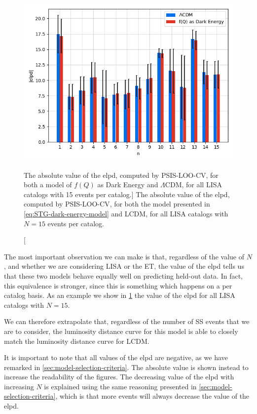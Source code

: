 \begin{figure}[h!]
    \centering
    \includegraphics[width=0.7\columnwidth]{figures/elpd-LISA-N15.png}
    \caption
    [The absolute value of the elpd, computed by PSIS-LOO-CV, for both a model of $f(Q)$ as Dark Energy and $\Lambda$CDM, for all LISA catalogs with 15 events per catalog.]
    {The absolute value of the \gls{elpd}, computed by \gls{PSIS-LOO-CV}, for both the model presented in \cref{eq:STG-dark-energy-model} and \gls{LCDM}, for all \gls{LISA} catalogs with $N = 15$ events per catalog.}
    \label{fig:elpd-LISA-N15}
\end{figure}

The most important observation we can make is that, regardless of the value of $N$, and whether we are considering \gls{LISA} or the \gls{ET}, the value of the \gls{elpd} tells us that these two models behave equally well on predicting held-out data. In fact, this equivalence is stronger, since this is something which happens on a per catalog basis. As an example we show in \cref{fig:elpd-LISA-N15} the value of the \gls{elpd} for all \gls{LISA} catalogs with $N = 15$.

We can therefore extrapolate that, regardless of the number of \gls{SS} events that we are to consider, the luminosity distance curve for this model is able to closely match the luminosity distance curve for \gls{LCDM}.

It is important to note that all values of the \gls{elpd} are negative, as we have remarked in \cref{sec:model-selection-criteria}. The absolute value is shown instead to increase the readability of the figures. The decreasing value of the \gls{elpd} with increasing $N$ is explained using the same reasoning presented in \cref{sec:model-selection-criteria}, which is that more events will always decrease the value of the \gls{elpd}.


